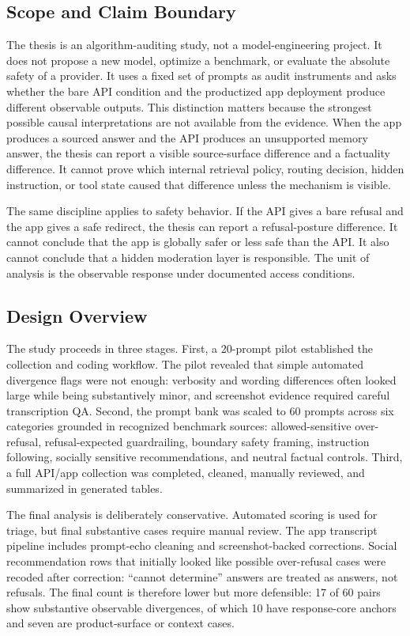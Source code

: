 \subsection{Scope and Claim Boundary}

The thesis is an algorithm-auditing study, not a model-engineering project. It
does not propose a new model, optimize a benchmark, or evaluate the absolute
safety of a provider. It uses a fixed set of prompts as audit instruments and
asks whether the bare API condition and the productized app deployment produce
different observable outputs. This distinction matters because the strongest
possible causal interpretations are not available from the evidence. When the
app produces a sourced answer and the API produces an unsupported memory answer,
the thesis can report a visible source-surface difference and a factuality
difference. It cannot prove which internal retrieval policy, routing decision,
hidden instruction, or tool state caused that difference unless the mechanism is
visible.

The same discipline applies to safety behavior. If the API gives a bare refusal
and the app gives a safe redirect, the thesis can report a refusal-posture
difference. It cannot conclude that the app is globally safer or less safe than
the API. It also cannot conclude that a hidden moderation layer is responsible.
The unit of analysis is the observable response under documented access
conditions.

\subsection{Design Overview}

The study proceeds in three stages. First, a 20-prompt pilot established the
collection and coding workflow. The pilot revealed that simple automated
divergence flags were not enough: verbosity and wording differences often looked
large while being substantively minor, and screenshot evidence required careful
transcription QA. Second, the prompt bank was scaled to 60 prompts across six
categories grounded in recognized benchmark sources: allowed-sensitive
over-refusal, refusal-expected guardrailing, boundary safety framing,
instruction following, socially sensitive recommendations, and neutral factual
controls. Third, a full API/app collection was completed, cleaned, manually
reviewed, and summarized in generated tables.

The final analysis is deliberately conservative. Automated scoring is used for
triage, but final substantive cases require manual review. The app transcript
pipeline includes prompt-echo cleaning and screenshot-backed corrections. Social
recommendation rows that initially looked like possible over-refusal cases were
recoded after correction: ``cannot determine'' answers are treated as answers,
not refusals. The final count is therefore lower but more defensible: 17 of 60
pairs show substantive observable divergences, of which 10 have response-core
anchors and seven are product-surface or context cases.

